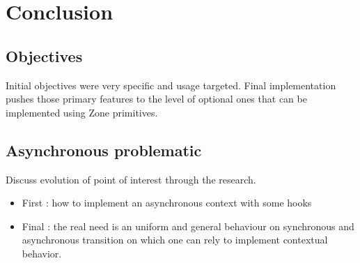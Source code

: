 
\chapter{Conclusion}

\section{Objectives}

Initial objectives were very specific and usage targeted. Final implementation pushes those primary features to the level of optional ones that can be implemented using Zone primitives.

\section{Asynchronous problematic}

Discuss evolution of point of interest through the research.

\begin{itemize}
\item First : how to implement an asynchronous context with some hooks
\item Final : the real need is an uniform and general behaviour on synchronous and asynchronous transition on which one can rely to implement contextual behavior.
\end{itemize}